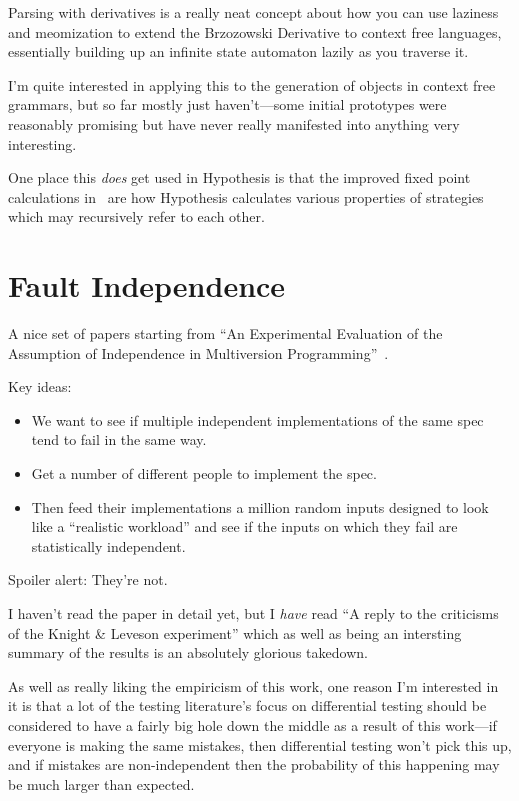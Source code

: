 \documentclass[a4paper]{book}
\begin{document}
Parsing with derivatives\cite{DBLP:conf/icfp/MightDS11, DBLP:conf/pldi/0001HM16} is a really neat concept about how you can use laziness and meomization to extend the Brzozowski Derivative to context free languages,
essentially building up an infinite state automaton lazily as you traverse it.

I'm quite interested in applying this to the generation of objects in context free grammars,
but so far mostly just haven't---some
initial prototypes were reasonably promising but have never really manifested into anything very interesting.

One place this \emph{does} get used in Hypothesis is that the improved fixed point calculations in~\cite{DBLP:conf/pldi/0001HM16} are how Hypothesis calculates various properties of strategies which may recursively refer to each other.

\section{Fault Independence}

A nice set of papers starting from ``An Experimental Evaluation of the Assumption of Independence in Multiversion Programming''~\cite{DBLP:journals/tse/KnightL86}.

Key ideas:

\begin{itemize}
\item We want to see if multiple independent implementations of the same spec tend to fail in the same way.
\item Get a number of different people to implement the spec.
\item Then feed their implementations a million random inputs designed to look like a ``realistic workload'' and see if the inputs on which they fail are statistically independent.
\end{itemize}

Spoiler alert: They're not.

I haven't read the paper in detail yet,
but I \emph{have} read ``A reply to the criticisms of the Knight \& Leveson experiment''\cite{knight1990reply} which as well as being an intersting summary of the results is an absolutely glorious takedown.

As well as really liking the empiricism of this work,
one reason I'm interested in it is that a lot of the testing literature's focus on differential testing should be considered to have a fairly big hole down the middle as a result of this work---if everyone is making the same mistakes,
then differential testing won't pick this up,
and if mistakes are non-independent then the probability of this happening may be much larger than expected.
\end{document}
